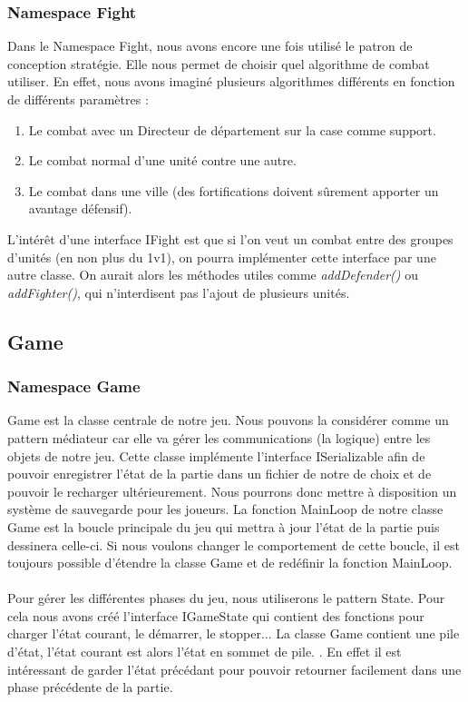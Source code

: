 		\subsubsection{Namespace Fight}
			Dans le Namespace Fight, nous avons encore une fois utilisé le patron de conception stratégie.
			Elle nous permet de choisir quel algorithme de combat utiliser.
			En effet, nous avons imaginé plusieurs algorithmes différents en fonction de différents paramètres :
			\begin{enumerate}
				\item Le combat avec un Directeur de département sur la case comme support.
				\item Le combat normal d'une unité contre une autre.
				\item Le combat dans une ville (des fortifications doivent sûrement apporter un avantage défensif).
			\end{enumerate}
			L'intérêt d'une interface IFight est que si l'on veut un combat entre des groupes d'unités (en non plus du 1v1), on pourra implémenter cette interface par une autre classe.
			On aurait alors les méthodes utiles comme \textit{addDefender()} ou \textit{addFighter()}, qui n'interdisent pas l'ajout de plusieurs unités.
		
	\subsection{Game}	
		\subsubsection{Namespace Game}
				Game est la classe centrale de notre jeu. 
				Nous pouvons la considérer comme un pattern médiateur car elle va gérer les communications (la logique) entre les objets de notre jeu.
			Cette classe implémente l'interface ISerializable afin de pouvoir enregistrer l'état de la partie dans un fichier de notre de choix et de pouvoir le recharger ultérieurement. Nous pourrons donc mettre à disposition un système de sauvegarde pour les joueurs. 
			La fonction MainLoop de notre classe Game est la boucle principale du jeu qui mettra à jour l'état de la partie puis dessinera celle-ci. 
			Si nous voulons changer le comportement de cette boucle, il est toujours possible d'étendre la classe Game et de redéfinir la fonction MainLoop.
				\paragraph{}
				Pour gérer les différentes phases du jeu, nous utiliserons le pattern State. 
			Pour cela nous avons créé l'interface IGameState qui contient des fonctions pour charger l'état courant, le démarrer, le stopper...
			La classe Game contient une pile d'état, l'état courant est alors l'état en sommet de pile. .
			En effet il est intéressant de garder l'état précédant pour pouvoir retourner facilement dans une phase précédente de la partie.
